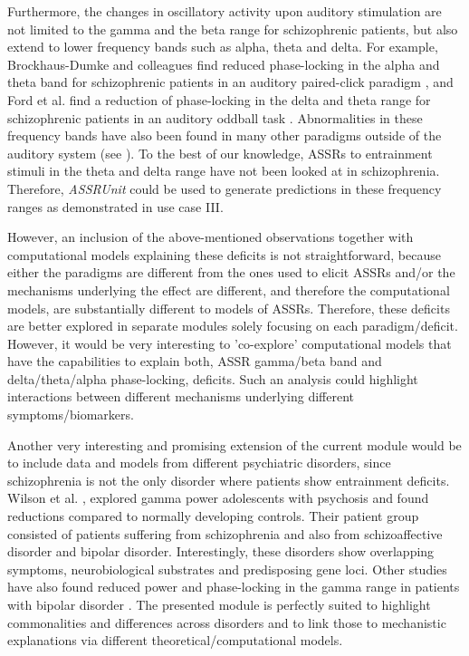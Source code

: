 \documentclass[a4paper,10pt]{article}
\begin{document}
Furthermore, the changes in oscillatory activity upon auditory stimulation are not limited to the gamma and the beta range for schizophrenic patients, but also extend to lower frequency bands such as alpha, theta and delta.
For example, Brockhaus-Dumke and colleagues find reduced phase-locking in the alpha and theta band for schizophrenic patients in an auditory paired-click paradigm \cite{Brockhaus2008}, and Ford et al. find a
reduction of phase-locking in the delta and theta range for schizophrenic patients in an auditory oddball task \cite{Ford2008}. Abnormalities in these frequency bands have also been found in many other paradigms outside of
the auditory system (see \cite{Basar2013}). To the best of our knowledge, ASSRs to entrainment stimuli in the theta and delta range have not been looked at in schizophrenia. Therefore, \textit{ASSRUnit} could be 
used to generate predictions in these frequency ranges as demonstrated in use case III.

However, an inclusion of the above-mentioned observations together with computational models explaining these deficits is not straightforward, because either the paradigms are different from the ones
used to elicit ASSRs and/or the mechanisms underlying the effect are different, and therefore the computational models, are substantially different to models of ASSRs. Therefore, these deficits are better explored in separate modules solely focusing
on each paradigm/deficit. However, it would be very interesting to 'co-explore' computational models that have the capabilities to explain both, ASSR gamma/beta band and delta/theta/alpha phase-locking, deficits. Such an analysis 
could highlight interactions between different mechanisms underlying different symptoms/biomarkers.

Another very interesting and promising extension of the current module would be to include data and models from different psychiatric disorders, since schizophrenia is not the only disorder
where patients show entrainment deficits. Wilson et al. \cite{Wilson2007}, explored gamma power adolescents with psychosis and found reductions compared to normally developing controls. Their patient group
consisted of patients suffering from schizophrenia and also from schizoaffective disorder and bipolar disorder. Interestingly, these disorders show overlapping symptoms, neurobiological substrates and predisposing gene loci. 
Other studies have also found reduced power and phase-locking in the gamma range in patients 
with bipolar disorder \cite{ODonnell2004,Spencer2008,Rass2010}.
The presented module is perfectly suited to highlight commonalities and differences across disorders and to link those to mechanistic 
explanations via different theoretical/computational models.
\end{document}
